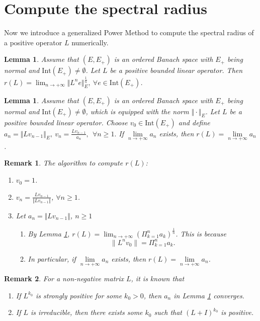 \documentclass[12pt,reqno]{article}
\newtheorem{lemma}[theorem]{Lemma}
\newtheorem{remark}{Remark}
\newcommand{\Int}{\mathrm{Int}}
\begin{document}
\section{Compute the spectral radius}\label{sec:spectral}
 Now we introduce a generalized Power Method to compute the spectral radius of a positive operator $L$ numerically.

\begin{lemma}\label{lem:com:r(L):1}
	Assume that $(E,E_+)$ is an ordered Banach space with $E_+$ being normal and $\Int (E_+) \neq \emptyset$. Let $L$ be a positive bounded linear operator. Then $r(L)= \lim_{n \rightarrow +\infty } \Vert L^n e \Vert_E^{\frac{1}{n}},~\forall e \in \Int (E_+)$.
\end{lemma}
\begin{lemma}\label{lem:com:r(L):2}
	Assume that $(E,E_+)$ is an ordered Banach space with $E_+$ being normal and $\Int (E_+) \neq \emptyset$, which is equipped with the norm $\Vert \cdot \Vert_E$. Let $L$ be a positive bounded linear operator. Choose $v_0 \in \Int (E_+)$ and define
	$
	a_n=\Vert L v_{n-1} \Vert_E,~
	v_n =\frac{ L v_{n-1}}{a_n}, ~
	~\forall n\geq 1.
	$
	If $\lim\limits_{ n\rightarrow +\infty} a_n$ exists, then $r(L)=\lim\limits_{ n\rightarrow +\infty} a_n$.
\end{lemma}

\begin{remark}\label{rem:com:r(L)}
	The algorithm to compute $r(L)$:
	\begin{enumerate}
		\item $v_0=1$.
		\item $v_n = \frac{L v_{n-1}}{\Vert L v_{n-1} \Vert }$, $\forall n \geq 1$.
		\item Let $a_n =\Vert L v_{n-1} \Vert $, $n\geq 1$
		\begin{enumerate}
			\item By Lemma \ref{lem:com:r(L):1}, $r(L)= \lim_{n \rightarrow +\infty } (\Pi_{k=1}^n a_k )^{\frac{1}{n}}$. This is because
			\begin{equation}
			{\|L^n v_0\|} = \Pi_{k=1}^n a_k .
			\end{equation}
			\item In particular, if $\lim\limits_{ n\rightarrow +\infty} a_n$ exists, then $r(L)=\lim\limits_{ n\rightarrow +\infty} a_n$.
		\end{enumerate}
	\end{enumerate}
\end{remark}

\begin{remark}
	For a  non-negative matrix $L$, it is known that
	\begin{enumerate}
		\item If $L^{k_0}$ is strongly positive for some $k_0>0$, then $a_n$ in Lemma \ref{lem:com:r(L):2} converges.
		\item If $L$ is  irreducible, then there exists some $k_0$ such that $(L+I)^{k_0}$ is positive.
	\end{enumerate}
\end{remark}
\end{document}
